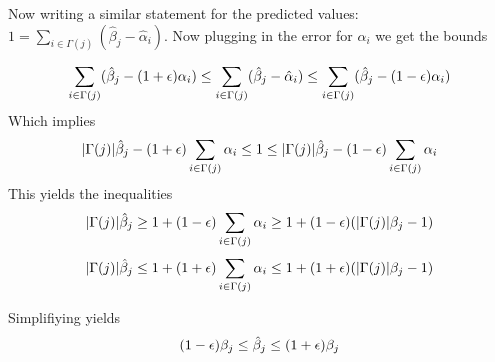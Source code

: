 \documentclass[11pt]{article}
\newcommand{\eps}{\ensuremath \epsilon}
\begin{document}
Now writing a similar statement for the predicted values: $1 = \sum_{i \in \Gamma(j)} (\hat{\beta}_j - \hat{\alpha}_i)$.  Now plugging in the error for $\hat{\alpha}_i$ we get the bounds

\[
 \sum_{i \in \Gamma(j)} (\hat{\beta}_j - (1+\eps)\alpha_i)  \leq
 \sum_{i \in \Gamma(j)} (\hat{\beta}_j - \hat{\alpha}_i) 
 \leq \sum_{i \in \Gamma(j)} (\hat{\beta}_j -(1-\eps) \alpha_i)
\]
Which implies
\[
 |\Gamma(j)| \hat{\beta}_j-(1+\eps)\sum_{i \in \Gamma(j)} \alpha_i  \leq
1
 \leq |\Gamma(j)|\hat{\beta}_j -(1-\eps) \sum_{i \in \Gamma(j)} \alpha_i
\]
This yields the inequalities
\[
|\Gamma(j) |\hat{\beta}_j \geq 1 + (1-\eps) \sum_{i \in \Gamma(j)} \alpha_i \geq 1 + (1-\eps) ( |\Gamma(j)| \beta_j -1 ) 
\]
\[
|\Gamma(j) |\hat{\beta}_j \leq 1 + (1+\eps) \sum_{i \in \Gamma(j)} \alpha_i \leq 1 + (1+\eps) ( |\Gamma(j)| \beta_j -1 )
\]

Simplifiying yields
\[
 (1-\eps) \beta_j \leq \hat{\beta}_j \leq (1+\eps) \beta_j
\]
\end{document}
